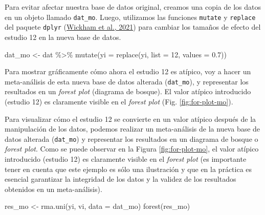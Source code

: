 \documentclass[
  bookmarksnumbered]{article}
\newenvironment{Shaded}{\begin{snugshade}}{\end{snugshade}}
\newcommand{\AttributeTok}[1]{\textcolor[rgb]{0.00,0.34,0.68}{#1}}
\newcommand{\DecValTok}[1]{\textcolor[rgb]{0.69,0.50,0.00}{#1}}
\newcommand{\FloatTok}[1]{\textcolor[rgb]{0.69,0.50,0.00}{#1}}
\newcommand{\FunctionTok}[1]{\textcolor[rgb]{0.39,0.29,0.61}{#1}}
\newcommand{\NormalTok}[1]{\textcolor[rgb]{0.12,0.11,0.11}{#1}}
\newcommand{\OtherTok}[1]{\textcolor[rgb]{0.00,0.43,0.16}{#1}}
\newcommand{\SpecialCharTok}[1]{\textcolor[rgb]{0.24,0.68,0.91}{#1}}
\begin{document}
Para evitar afectar nuestra base de datos original, creamos una copia de los datos en un objeto llamado \texttt{dat\_mo}. Luego, utilizamos las funciones \texttt{mutate} y \texttt{replace} del paquete \texttt{dplyr} (\protect\hyperlink{ref-WickhamDplyr2021}{Wickham et al., 2021}) para cambiar los tamaños de efecto del estudio 12 en la nueva base de datos.

\begin{Shaded}
\begin{Highlighting}[]
\NormalTok{dat\_mo }\OtherTok{\textless{}{-}}\NormalTok{ dat }\SpecialCharTok{\%\textgreater{}\%}
  \FunctionTok{mutate}\NormalTok{(}\AttributeTok{yi =} \FunctionTok{replace}\NormalTok{(yi, }
                      \AttributeTok{list =} \DecValTok{12}\NormalTok{, }
                      \AttributeTok{values =} \FloatTok{0.7}\NormalTok{))}
\end{Highlighting}
\end{Shaded}

Para mostrar gráficamente cómo ahora el estudio 12 es atípico, voy a hacer un meta-análisis de esta nueva base de datos alterada (\texttt{dat\_mo}), y representar los resultados en un \emph{forest plot} (diagrama de bosque). El valor atípico introducido (estudio 12) es claramente visible en el \emph{forest plot} (Fig. \ref{fig:for-plot-mo}).

Para visualizar cómo el estudio 12 se convierte en un valor atípico después de la manipulación de los datos, podemos realizar un meta-análisis de la nueva base de datos alterada (\texttt{dat\_mo}) y representar los resultados en un diagrama de bosque o \emph{forest plot}. Como se puede observar en la Figura \ref{fig:for-plot-mo}, el valor atípico introducido (estudio 12) es claramente visible en el \emph{forest plot} (es importante tener en cuenta que este ejemplo es sólo una ilustración y que en la práctica es esencial garantizar la integridad de los datos y la validez de los resultados obtenidos en un meta-análisis).

\begin{Shaded}
\begin{Highlighting}[]
\NormalTok{res\_mo }\OtherTok{\textless{}{-}} \FunctionTok{rma.uni}\NormalTok{(yi, vi, }\AttributeTok{data =}\NormalTok{ dat\_mo) }
\FunctionTok{forest}\NormalTok{(res\_mo)}
\end{Highlighting}
\end{Shaded}
\end{document}
